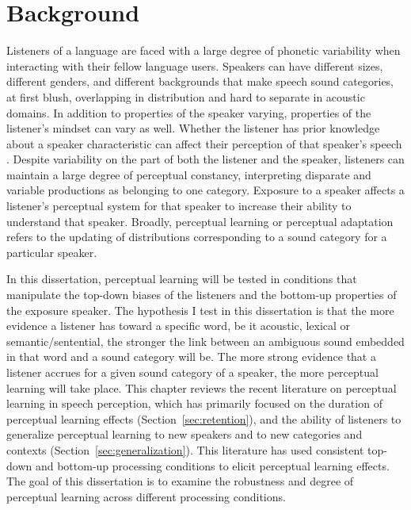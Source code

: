 
\chapter{Background}

Listeners of a language are faced with a large degree of phonetic variability when interacting with their fellow language users.  
Speakers can have different sizes, different genders, and different backgrounds that make speech sound categories, at first blush, overlapping in distribution and hard to separate in acoustic domains.
In addition to properties of the speaker varying, properties of the listener's mindset can vary as well.  
Whether the listener has prior knowledge about a speaker characteristic can affect their perception of that speaker's speech \citep{Pitt2012}.
Despite variability on the part of both the listener and the speaker, listeners can maintain a large degree of perceptual constancy, interpreting disparate and variable productions as belonging to one category.
Exposure to a speaker affects a listener's perceptual system for that speaker to increase their ability to understand that speaker.
Broadly, perceptual learning or perceptual adaptation refers to the updating of distributions corresponding to a sound category for a particular speaker.

In this dissertation, perceptual learning will be tested in conditions that manipulate the top-down biases of the listeners and the bottom-up properties of the exposure speaker.
The hypothesis I test in this dissertation is that the more evidence a listener has toward a specific word, be it acoustic, lexical or semantic/sentential, the stronger the link between an ambiguous sound embedded in that word and a sound category will be.
The more strong evidence that a listener accrues for a given sound category of a speaker, the more perceptual learning will take place.
This chapter reviews the recent literature on perceptual learning in speech perception, which has primarily focused on the duration of perceptual learning effects (Section~\ref{sec:retention}), and the ability of listeners to generalize perceptual learning to new speakers  and to new categories and contexts (Section~\ref{sec:generalization}). 
This literature has used consistent top-down and bottom-up processing conditions to elicit perceptual learning effects. 
 The goal of this dissertation is to examine the robustness and degree of perceptual learning across different processing conditions.

